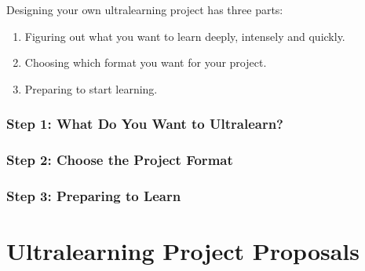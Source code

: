 Designing your own ultralearning project has three parts:

\begin{enumerate}
	\item Figuring out what you want to learn deeply, intensely and quickly.

	\item Choosing which format you want for your project.

	\item Preparing to start learning.
\end{enumerate}

\subsubsection*{Step 1: What Do You Want to Ultralearn?}

\subsubsection*{Step 2: Choose the Project Format}


\subsubsection*{Step 3: Preparing to Learn}

\section{Ultralearning Project Proposals}

